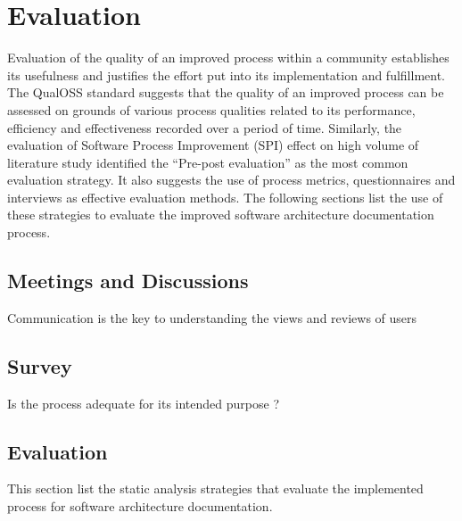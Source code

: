 \chapter{Evaluation}\label{chapter:Evaluation}
\indent Evaluation of the quality of an improved process within a community establishes its usefulness and justifies the effort put into its implementation and fulfillment.
\\\indent The QualOSS standard \cite{Shahin2014} suggests that the quality of an improved process can be assessed on grounds of various process qualities related to its performance, efficiency and effectiveness recorded over a period of time. Similarly, the evaluation of Software Process Improvement (SPI) \cite{Unterkalmsteiner2011} effect on high volume of literature study identified the \enquote{Pre-post evaluation} as the most common evaluation strategy.  It also suggests the use of process metrics, questionnaires and interviews as effective evaluation methods. The following sections list the use of these strategies to evaluate the improved software architecture documentation process.

\section{Meetings and Discussions}
\indent Communication is the key to understanding the views and reviews of users
\section{Survey}
Is the process adequate for its intended purpose ?

\section{Evaluation }
This section list the static analysis strategies that evaluate the implemented process for software architecture documentation.

